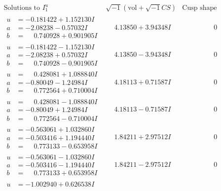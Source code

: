 \documentclass[1p]{elsarticle_modified}
\theoremstyle{definition}
\newcommand{\I}{\sqrt{-1}}
\begin{document}
$$\begin{array}{c|c|c}
\text{Solutions to }I^u_{1}& \I (\text{vol} + \sqrt{-1}CS) & \text{Cusp shape}\\
 \hline 
\begin{aligned}
u &= -0.181422 + 1.152130 I \\
a &= -2.08238 - 0.57032 I \\
b &= \phantom{-}0.740928 + 0.901905 I\end{aligned}
 & \phantom{-}4.13850 + 3.94348 I & \phantom{-0.000000 } 0 \\ \hline\begin{aligned}
u &= -0.181422 - 1.152130 I \\
a &= -2.08238 + 0.57032 I \\
b &= \phantom{-}0.740928 - 0.901905 I\end{aligned}
 & \phantom{-}4.13850 - 3.94348 I & \phantom{-0.000000 } 0 \\ \hline\begin{aligned}
u &= \phantom{-}0.428081 + 1.088840 I \\
a &= -0.80049 - 1.24984 I \\
b &= \phantom{-}0.772564 + 0.710004 I\end{aligned}
 & \phantom{-}4.18113 + 0.71587 I & \phantom{-0.000000 } 0 \\ \hline\begin{aligned}
u &= \phantom{-}0.428081 - 1.088840 I \\
a &= -0.80049 + 1.24984 I \\
b &= \phantom{-}0.772564 - 0.710004 I\end{aligned}
 & \phantom{-}4.18113 - 0.71587 I & \phantom{-0.000000 } 0 \\ \hline\begin{aligned}
u &= -0.563061 + 1.032860 I \\
a &= -0.503416 + 1.194440 I \\
b &= \phantom{-}0.773133 - 0.653958 I\end{aligned}
 & \phantom{-}1.84211 + 2.97512 I & \phantom{-0.000000 } 0 \\ \hline\begin{aligned}
u &= -0.563061 - 1.032860 I \\
a &= -0.503416 - 1.194440 I \\
b &= \phantom{-}0.773133 + 0.653958 I\end{aligned}
 & \phantom{-}1.84211 - 2.97512 I & \phantom{-0.000000 } 0 \\ \hline\begin{aligned}
u &= -1.002940 + 0.626538 I \\

\end{aligned}
\end{array}$$
\end{document}
